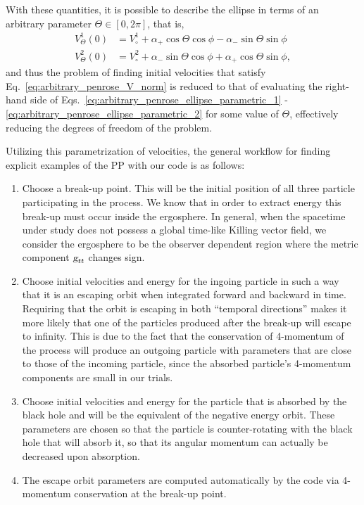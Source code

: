 With these quantities, it is possible to describe the ellipse in terms of an arbitrary parameter $\Theta \in \left[0,2\pi\right]$, that is,
%
\begin{align}
  V^{1}_{\Theta}(0) & =  V^{1}_\circ + \alpha_{+} \cos\Theta\cos\phi - \alpha_{-}\sin\Theta\sin\phi                                                  \label{eq:arbitrary_penrose_ellipse_parametric_1} \\
  V^{2}_{\Theta}(0) & = V^{2}_\circ + \alpha_{-} \sin\Theta\cos\phi + \alpha_{+}\cos\Theta\sin\phi, \label{eq:arbitrary_penrose_ellipse_parametric_2}
\end{align}
%
and thus the problem of finding initial velocities that satisfy Eq.~\eqref{eq:arbitrary_penrose_V_norm} is reduced to that of evaluating the right-hand side of Eqs.~\eqref{eq:arbitrary_penrose_ellipse_parametric_1} - \eqref{eq:arbitrary_penrose_ellipse_parametric_2} for some value of $\Theta$, effectively reducing the degrees of freedom of the problem.

Utilizing this parametrization of velocities, the general workflow for finding explicit examples of the \ac{PP} with our code is as follows:

\begin{enumerate}
  \item Choose a break-up point. This will be the initial position of all three particle participating in the process. We know that in order to extract energy this break-up must occur inside the ergosphere. In general, when the spacetime under study does not possess a global time-like Killing vector field, we consider the ergosphere to be the observer dependent region where the metric component $\mtrtens{t}{t}$ changes sign.
  \item Choose initial velocities and energy for the ingoing particle in such a way that it is an escaping orbit when integrated forward and backward in time. Requiring that the orbit is escaping in both ``temporal directions'' makes it more likely that one of the particles produced after the break-up will escape to infinity. This is due to the fact that the conservation of 4-momentum of the process will produce an outgoing particle with parameters that are close to those of the incoming particle, since the absorbed particle's 4-momentum components are small in our trials.
  \item Choose initial velocities and energy for the particle that is absorbed by the black hole and will be the equivalent of the negative energy orbit. These parameters are chosen so that the particle is counter-rotating with the black hole that will absorb it, so that its angular momentum can actually be decreased upon absorption.
  \item The escape orbit parameters are computed automatically by the code via 4-momentum conservation at the break-up point.
\end{enumerate}

